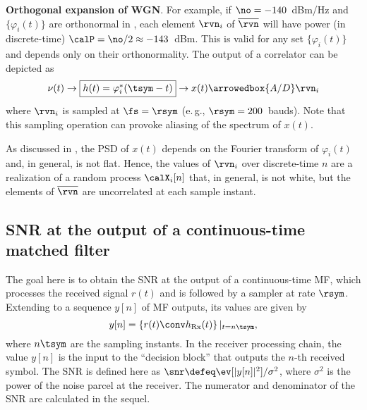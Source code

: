 \bExample \textbf{Orthogonal expansion of WGN}.
For example, if $\no = -140$~dBm/Hz and $\{\varphi_i(t)\}$ are orthonormal in , each element $\rvn_i$ of $\overline \rvn$ will have power (in discrete-time) $\calP = \no/2 \approx -143$~dBm. This is valid for any set $\{\varphi_i(t)\}$ and depends only on their orthonormality. The output of a correlator can be depicted as
\begin{align*}
\nu(t) \rightarrow \fbox{$h(t)=\varphi_i^*(\tsym-t)$} \rightarrow x(t) \arrowedbox{A/D}  \rvn_i
\end{align*}
where $\rvn_i$ is sampled at $\fs = \rsym$ (e.\,g., $\rsym=200$~bauds).
Note that this sampling operation can provoke aliasing of the
spectrum of $x(t)$. 

As discussed in , 
the PSD of $x(t)$ depends on the Fourier transform of $\varphi_i(t)$ and, in general,
is not flat. Hence, the values of $\rvn_i$ over discrete-time $n$ are a realization of a random process $\calX_i[n]$ that, in general, is not white, but the elements of $\overline \rvn$ are uncorrelated at each sample instant.
\eExample


\subsection{SNR at the output of a continuous-time matched filter}
\label{sec:equivalentAWGNAtMFOutput}


The goal here is to obtain the SNR at the output of a continuous-time MF,
which processes the received signal $r(t)$ and is followed by a sampler at rate $\rsym$.
Extending  to a sequence $y[n]$ of MF outputs, its values are given by
\[
y[n] = \left\{ r(t) \conv h_\textrm{Rx}(t) \right\} |_{t=n \tsym},
\]
where $n \tsym$ are the sampling instants. In the receiver processing chain, the value
$y[n]$ is the input to the ``decision block'' that outputs the $n$-th received symbol.
 The SNR is defined here as $\snr \defeq \ev[|y[n]|^2]/\sigma^2$, where $\sigma^2$ is the power 
of the noise parcel at the receiver. The numerator and denominator of the SNR are calculated
in the sequel.

